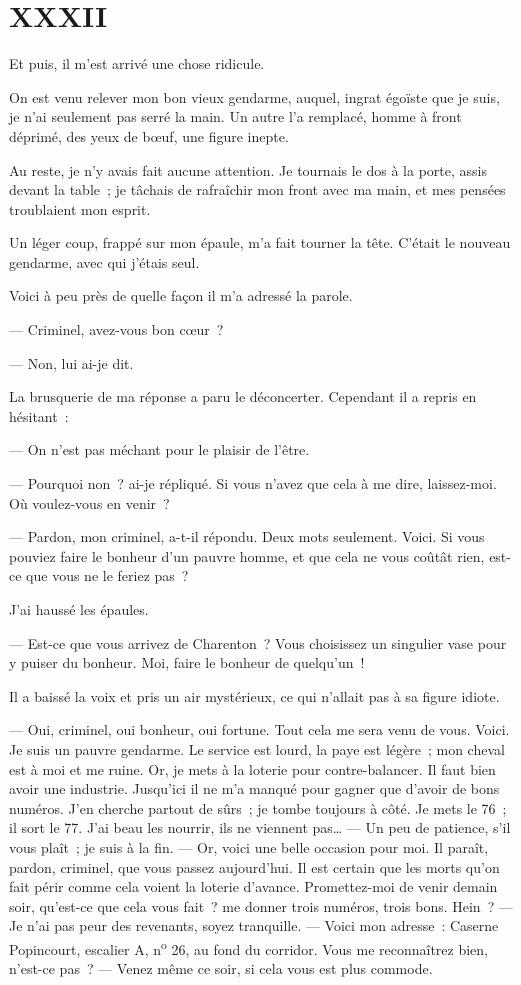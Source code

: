 \documentclass[french,twoside]{book} %
\begin{document}
 \section[{XXXII}]{XXXII}
\label{ch32}\renewcommand{\leftmark}{XXXII}

\noindent Et puis, il m’est arrivé une chose ridicule.\par
On est venu relever mon bon vieux gendarme, auquel, ingrat égoïste que je suis, je n’ai seulement pas serré la main. Un autre l’a remplacé, homme à front déprimé, des yeux de bœuf, une figure inepte.\par
Au reste, je n’y avais fait aucune attention. Je tournais le dos à la porte, assis devant la table ; je tâchais de rafraîchir mon front avec ma main, et mes pensées troublaient mon esprit.\par
Un léger coup, frappé sur mon épaule, m’a fait tourner la tête. C’était le nouveau gendarme, avec qui j’étais seul.\par
Voici à peu près de quelle façon il m’a adressé la parole.\par
— Criminel, avez-vous bon cœur ?\par
— Non, lui ai-je dit.\par
La brusquerie de ma réponse a paru le déconcerter. Cependant il a repris en hésitant :\par
— On n’est pas méchant pour le plaisir de l’être.\par
— Pourquoi non ? ai-je répliqué. Si vous n’avez que cela à me dire, laissez-moi. Où voulez-vous en venir ?\par
 — Pardon, mon criminel, a-t-il répondu. Deux mots seulement. Voici. Si vous pouviez faire le bonheur d’un pauvre homme, et que cela ne vous coûtât rien, est-ce que vous ne le feriez pas ?\par
J’ai haussé les épaules.\par
— Est-ce que vous arrivez de Charenton ? Vous choisissez un singulier vase pour y puiser du bonheur. Moi, faire le bonheur de quelqu’un !\par
Il a baissé la voix et pris un air mystérieux, ce qui n’allait pas à sa figure idiote.\par
— Oui, criminel, oui bonheur, oui fortune. Tout cela me sera venu de vous. Voici. Je suis un pauvre gendarme. Le service est lourd, la paye est légère ; mon cheval est à moi et me ruine. Or, je mets à la loterie pour contre-balancer. Il faut bien avoir une industrie. Jusqu’ici il ne m’a manqué pour gagner que d’avoir de bons numéros. J’en cherche partout de sûrs ; je tombe toujours à côté. Je mets le 76 ; il sort le 77. J’ai beau les nourrir, ils ne viennent pas… — Un peu de patience, s’il vous plaît ; je suis à la fin. — Or, voici une belle occasion pour moi. Il paraît, pardon, criminel, que vous passez aujourd’hui. Il est certain que les morts qu’on fait périr comme cela voient la loterie d’avance. Promettez-moi de venir demain soir, qu’est-ce que cela vous fait ? me donner trois numéros, trois bons. Hein ? — Je n’ai pas peur des revenants, soyez tranquille. — Voici mon adresse : Caserne Popincourt, escalier A, n\textsuperscript{o} 26, au fond du corridor. Vous me reconnaîtrez bien, n’est-ce pas ? — Venez même ce soir, si cela vous est plus commode.\par
\end{document}
